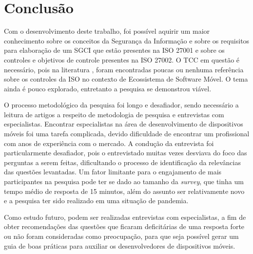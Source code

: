  \chapter{\label{chap:intro}Conclusão}
 



Com o desenvolvimento deste trabalho, foi possível aquirir um maior conhecimento sobre os conceitos da Segurança da Informação e sobre os requisitos para elaboração de um SGCI que estão presentes na ISO 27001 e sobre os controles e objetivos de controle presentes na ISO 27002.  O TCC em questão é necessário, pois na literatura  \cite{caio2019}, foram encontradas poucas ou nenhuma referência sobre os controles da ISO no contexto de Ecossistema de Software Móvel. O tema ainda é pouco explorado, entretanto a pesquisa se demonstrou viável.
 
O processo metodológico da pesquisa foi longo e desafiador, sendo necessário a leitura de artigos a respeito de metodologia de pesquisa e entrevistas com especialistas. Encontrar especialistas na área de desenvolvimento de dispositivos móveis foi uma tarefa complicada, devido dificuldade de encontrar um profissional com anos de experiência com o mercado. A condução da entrevista foi particularmente desafiador, pois o entrevistado muitas vezes desviava do foco das perguntas a serem feitas, dificultando o processo de identificação da relevâncias das questões levantadas. Um fator limitante para o engajamento de mais participantes na pesquisa pode ter se dado ao tamanho da \textit{survey}, que tinha um tempo médio de resposta de 15 minutos, além do assunto ser relativamente novo e a pesquisa ter sido realizado em uma situação de pandemia.
 
 
Como estudo futuro, podem ser realizadas entrevistas com especialistas, a fim de obter recomendações das questões que ficaram deficitárias de uma resposta forte ou não foram consideradas como preocupação, para que seja possível gerar um guia de boas práticas para auxiliar os desenvolvedores de dispositivos móveis.
 




